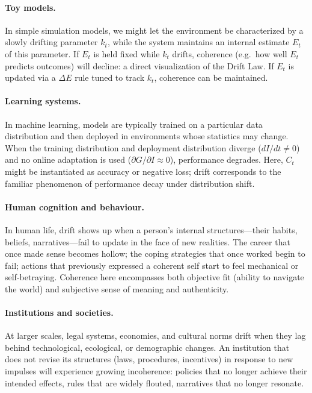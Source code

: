 \documentclass[12pt,a4paper]{report}
\begin{document}
\paragraph{Toy models.} In simple simulation models, we might let the environment be characterized by a slowly drifting parameter \(k_t\), while the system maintains an internal estimate \(E_t\) of this parameter. If \(E_t\) is held fixed while \(k_t\) drifts, coherence (e.g.\ how well \(E_t\) predicts outcomes) will decline: a direct visualization of the Drift Law. If \(E_t\) is updated via a $\Delta E$ rule tuned to track \(k_t\), coherence can be maintained.

\paragraph{Learning systems.} In machine learning, models are typically trained on a particular data distribution and then deployed in environments whose statistics may change. When the training distribution and deployment distribution diverge (\(dI/dt \neq 0\)) and no online adaptation is used (\(\partial G/\partial I \approx 0\)), performance degrades. Here, \(C_t\) might be instantiated as accuracy or negative loss; drift corresponds to the familiar phenomenon of performance decay under distribution shift.

\paragraph{Human cognition and behaviour.} In human life, drift shows up when a person's internal structures---their habits, beliefs, narratives---fail to update in the face of new realities. The career that once made sense becomes hollow; the coping strategies that once worked begin to fail; actions that previously expressed a coherent self start to feel mechanical or self-betraying. Coherence here encompasses both objective fit (ability to navigate the world) and subjective sense of meaning and authenticity.

\paragraph{Institutions and societies.} At larger scales, legal systems, economies, and cultural norms drift when they lag behind technological, ecological, or demographic changes. An institution that does not revise its structures (laws, procedures, incentives) in response to new impulses will experience growing incoherence: policies that no longer achieve their intended effects, rules that are widely flouted, narratives that no longer resonate.
\end{document}
